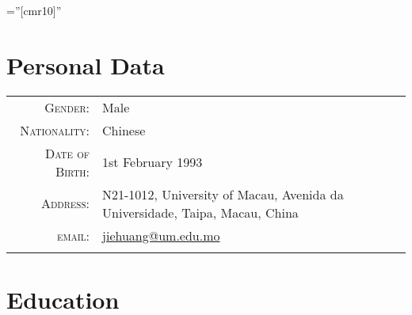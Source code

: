 \documentclass[a4paper,10pt]{article} %
\begin{document}
\font\fb=''[cmr10]'' %

\par{\bigskip\par} %

\section{Personal Data}

\begin{tabular}{rl}
\textsc{Gender:}                  	& Male \\
\textsc{Nationality:}               & Chinese \\
\textsc{Date of Birth:} 	        & 1st February 1993  \\
\textsc{Address:} 					& N21-1012, University of Macau, Avenida da Universidade, Taipa, Macau, China  \\
\textsc{email:} 					& 
\href{mailto:jiehuang@um.edu.mo}{jiehuang@um.edu.mo} \\
\multicolumn{2}{c}{} \\	%
\end{tabular}



\section{Education}
\end{document}
